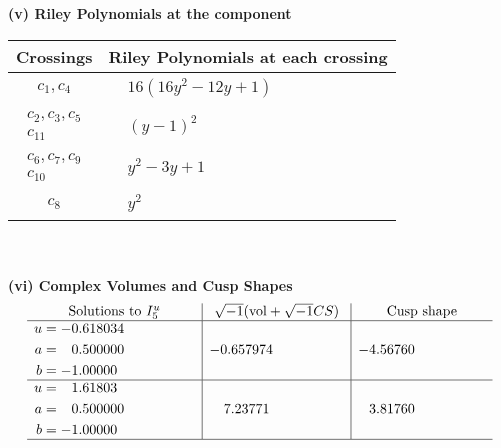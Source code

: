 \documentclass[1p]{elsarticle_modified}
\theoremstyle{definition}
\newcommand{\I}{\sqrt{-1}}
\begin{document}
\newpage\renewcommand{\arraystretch}{1}
\flushleft \textbf{(v) Riley Polynomials at the component}\newline \\
\begin{tabular}{m{50pt}|m{274pt}}
Crossings & \hspace{64pt}Riley Polynomials at each crossing \\
\hline $$\begin{aligned}c_{1},c_{4}\end{aligned}$$&$\begin{aligned}
&16(16 y^2-12 y+1)
\end{aligned}$\\
\hline $$\begin{aligned}c_{2},c_{3},c_{5}\\c_{11}\end{aligned}$$&$\begin{aligned}
&(y-1)^2
\end{aligned}$\\
\hline $$\begin{aligned}c_{6},c_{7},c_{9}\\c_{10}\end{aligned}$$&$\begin{aligned}
&y^2-3 y+1
\end{aligned}$\\
\hline $$\begin{aligned}c_{8}\end{aligned}$$&$\begin{aligned}
&y^2
\end{aligned}$\\
\hline
\end{tabular}\\~\\
\newpage\flushleft \textbf{(vi) Complex Volumes and Cusp Shapes}
$$\begin{array}{c|c|c}  
\text{Solutions to }I^u_{5}& \I (\text{vol} + \sqrt{-1}CS) & \text{Cusp shape}\\
 \hline 
\begin{aligned}
u &= -0.618034\phantom{ +0.000000I} \\
a &= \phantom{-}0.500000\phantom{ +0.000000I} \\
b &= -1.00000\phantom{ +0.000000I}\end{aligned}
 & -0.657974\phantom{ +0.000000I} & -4.56760\phantom{ +0.000000I} \\ \hline\begin{aligned}
u &= \phantom{-}1.61803\phantom{ +0.000000I} \\
a &= \phantom{-}0.500000\phantom{ +0.000000I} \\
b &= -1.00000\phantom{ +0.000000I}\end{aligned}
 & \phantom{-}7.23771\phantom{ +0.000000I} & \phantom{-}3.81760\phantom{ +0.000000I}\\
 \hline 
 \end{array}$$\newpage\newpage\renewcommand{\arraystretch}{1}
\end{document}

